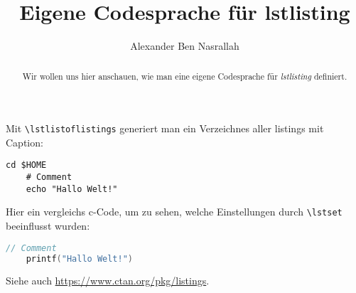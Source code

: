 \documentclass[a4paper]{article}
\title{Eigene Codesprache f\"ur lstlisting}
\author{Alexander Ben Nasrallah}
\begin{document}
\maketitle
\begin{abstract}
	Wir wollen uns hier anschauen, wie man eine eigene Codesprache f\"ur
	\emph{lstlisting} definiert.
\end{abstract}

Mit \verb+\lstlistoflistings+ generiert man ein Verzeichnes aller listings mit
Caption:
\lstlistoflistings

\begin{lstlisting}[language=cli, title=Titel, caption={Command line}]
	cd $HOME
	# Comment
	echo "Hallo Welt!"
\end{lstlisting}

Hier ein vergleichs c-Code, um zu sehen, welche Einstellungen durch
\verb+\lstset+ beeinflusst wurden:
\begin{lstlisting}[language=C, caption={c-Code mit Standardeinstellungen}]
	// Comment
	printf("Hallo Welt!")
\end{lstlisting}

Siehe auch \url{https://www.ctan.org/pkg/listings}.
\end{document}
